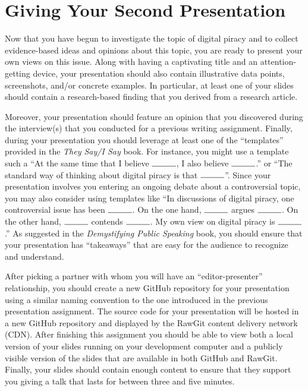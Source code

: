 

\usepackage[compact]{titlesec}




\vspace*{-.2in}
\section*{Giving Your Second Presentation}

Now that you have begun to investigate the topic of digital piracy and to collect evidence-based ideas and opinions
about this topic, you are ready to present your own views on this issue. Along with having a captivating title and an
attention-getting device, your presentation should also contain illustrative data points, screenshots, and/or concrete
examples. In particular, at least one of your slides should contain a research-based finding that you derived from a
research article.

Moreover, your presentation should feature an opinion that you discovered during the interview(s) that you conducted for
a previous writing assignment. Finally, during your presentation you should leverage at least one of the ``templates''
provided in the {\em They Say/I Say} book. For instance, you might use a template such a ``At the same time that I
believe $\rule{1cm}{0.15mm}$, I also believe $\rule{1cm}{0.15mm}$.'' or ``The standard way of thinking about digital
piracy is that $\rule{1cm}{0.15mm}$''. Since your presentation involves you entering an ongoing debate about a
controversial topic, you may also consider using templates like ``In discussions of digital piracy, one controversial
issue has been $\rule{1cm}{0.15mm}$. On the one hand, $\rule{1cm}{0.15mm}$ argues $\rule{1cm}{0.15mm}$. On the other
hand, $\rule{1cm}{0.15mm}$ contends $\rule{1cm}{0.15mm}$. My own view on digital piracy is $\rule{1cm}{0.15mm}$.'' As
suggested in the {\em Demystifying Public Speaking} book, you should ensure that your presentation has ``takeaways''
that are easy for the audience to recognize and understand.

After picking a partner with whom you will have an ``editor-presenter'' relationship, you should create a new GitHub
repository for your presentation using a similar naming convention to the one introduced in the previous presentation
assignment. The source code for your presentation will be hosted in a new GitHub repository and displayed by the RawGit
content delivery network (CDN). After finishing this assignment you should be able to view both a local version of your
slides running on your development computer and a publicly visible version of the slides that are available in both
GitHub and RawGit. Finally, your slides should contain enough content to ensure that they support you giving a talk that
lasts for between three and five minutes.

